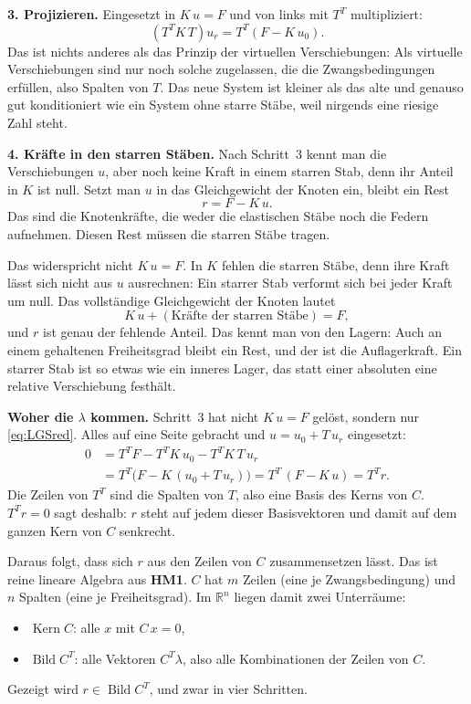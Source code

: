 \textbf{3. Projizieren.} Eingesetzt in $K\,u = F$ und von links mit $T^T$ multipliziert:
\begin{equation} \label{eq:LGSred}
  \left(T^T K\,T\right) u_r = T^T\left(F - K\,u_0\right).
\end{equation}
Das ist nichts anderes als das Prinzip der virtuellen Verschiebungen: Als virtuelle
Verschiebungen sind nur noch solche zugelassen, die die Zwangsbedingungen erfüllen, also Spalten
von $T$. Das neue System ist kleiner als das alte und genauso gut konditioniert wie ein System
ohne starre Stäbe, weil nirgends eine riesige Zahl steht.

\textbf{4. Kräfte in den starren Stäben.} Nach Schritt~3 kennt man die Verschiebungen $u$, aber
noch keine Kraft in einem starren Stab, denn ihr Anteil in $K$ ist null. Setzt man $u$ in das
Gleichgewicht der Knoten ein, bleibt ein Rest
\[
  r = F - K\,u .
\]
Das sind die Knotenkräfte, die weder die elastischen Stäbe noch die Federn aufnehmen. Diesen Rest
müssen die starren Stäbe tragen.

Das widerspricht nicht $K\,u = F$. In $K$ fehlen die starren Stäbe, denn ihre Kraft lässt sich
nicht aus $u$ ausrechnen: Ein starrer Stab verformt sich bei jeder Kraft um null. Das vollständige
Gleichgewicht der Knoten lautet
\[
  K\,u + (\text{Kräfte der starren Stäbe}) = F ,
\]
und $r$ ist genau der fehlende Anteil. Das kennt man von den Lagern: Auch an einem gehaltenen
Freiheitsgrad bleibt ein Rest, und der ist die Auflagerkraft. Ein starrer Stab ist so etwas wie ein
inneres Lager, das statt einer absoluten eine relative Verschiebung festhält.

\textbf{Woher die $\lambda$ kommen.} Schritt~3 hat nicht $K\,u = F$ gelöst, sondern nur
\eqref{eq:LGSred}. Alles auf eine Seite gebracht und $u = u_0 + T\,u_r$ eingesetzt:
\begin{align*}
  0 &= T^T F - T^T K\,u_0 - T^T K\,T\,u_r \\
    &= T^T\bigl(F - K\,(u_0 + T\,u_r)\bigr) = T^T\,(F - K\,u) = T^T r .
\end{align*}
Die Zeilen von $T^T$ sind die Spalten von $T$, also eine Basis des Kerns von $C$. $T^T r = 0$ sagt
deshalb: $r$ steht auf jedem dieser Basisvektoren und damit auf dem ganzen Kern von $C$ senkrecht.

Daraus folgt, dass sich $r$ aus den Zeilen von $C$ zusammensetzen lässt. Das ist reine lineare
Algebra aus \textbf{HM1}. $C$ hat $m$ Zeilen (eine je Zwangsbedingung) und $n$ Spalten (eine je
Freiheitsgrad). Im $\mathbb R^n$ liegen damit zwei Unterräume:
\begin{itemize}
  \item $\operatorname{Kern} C$: alle $x$ mit $C\,x = 0$,
  \item $\operatorname{Bild} C^T$: alle Vektoren $C^T\lambda$, also alle Kombinationen der Zeilen
        von $C$.
\end{itemize}
Gezeigt wird $r \in \operatorname{Bild} C^T$, und zwar in vier Schritten.

